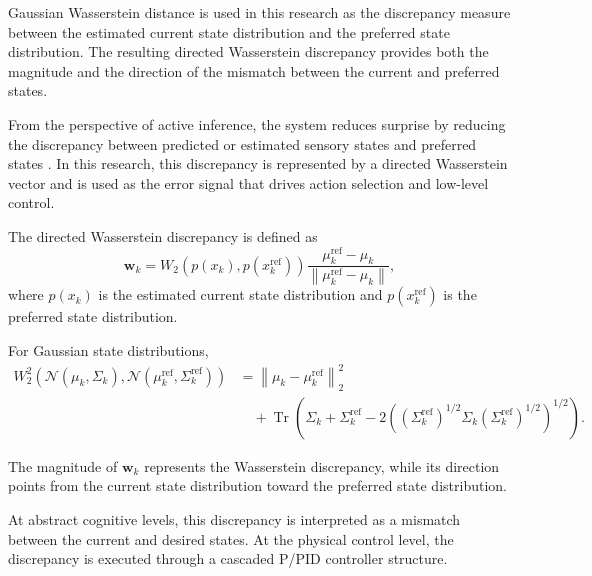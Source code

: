 \documentclass[a4paper]{article}
\begin{document}
         Gaussian Wasserstein distance is used in this research as the discrepancy measure between the estimated current state distribution and the preferred state distribution. The resulting directed Wasserstein discrepancy provides both the magnitude and the direction of the mismatch between the current and preferred states.

         From the perspective of active inference, the system reduces surprise by reducing the discrepancy between predicted or estimated sensory states and preferred states \cite{friston-2010-the-free-energy-principle-a-unified-brain-theory}. In this research, this discrepancy is represented by a directed Wasserstein vector and is used as the error signal that drives action selection and low-level control.

         The directed Wasserstein discrepancy is defined as
         \[
         \mathbf{w}_k
         =
         W_2
         \left(
         p(x_k),
         p(x_k^{\mathrm{ref}})
         \right)
         \frac{
         \mu_k^{\mathrm{ref}}-\mu_k
         }{
         \left\|
         \mu_k^{\mathrm{ref}}-\mu_k
         \right\|
         },
         \]
         where \(p(x_k)\) is the estimated current state distribution and \(p(x_k^{\mathrm{ref}})\) is the preferred state distribution.

         For Gaussian state distributions,
         \[
         \begin{aligned}
            W_2^2
            \left(
            \mathcal{N}(\mu_k,\Sigma_k),
            \mathcal{N}(\mu_k^{\mathrm{ref}},\Sigma_k^{\mathrm{ref}})
            \right)
            &=
            \left\|
            \mu_k-\mu_k^{\mathrm{ref}}
            \right\|_2^2
            \\
            &\quad+
            \operatorname{Tr}
            \left(
            \Sigma_k+\Sigma_k^{\mathrm{ref}}
            -
            2
            \left(
            (\Sigma_k^{\mathrm{ref}})^{1/2}
            \Sigma_k
            (\Sigma_k^{\mathrm{ref}})^{1/2}
            \right)^{1/2}
            \right).
         \end{aligned}
         \]

         The magnitude of \(\mathbf{w}_k\) represents the Wasserstein discrepancy, while its direction points from the current state distribution toward the preferred state distribution.

         At abstract cognitive levels, this discrepancy is interpreted as a mismatch between the current and desired states. At the physical control level, the discrepancy is executed through a cascaded P/PID controller structure.
\end{document}
